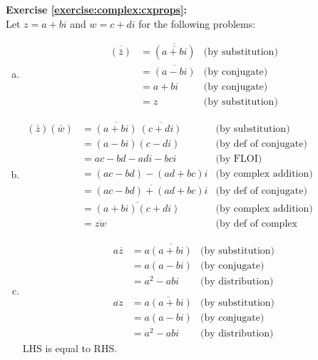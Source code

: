 \noindent\textbf{Exercise \ref{exercise:complex:cxprops}:}\\ %
Let $z=a+bi$ and $w=c+di$ for the following problems:
\begin{enumerate}[(a)]
\item
\begin{align*}
\overline{(\bar{z})} &= \overline{(\overline{a + bi})} &\text{(by substitution)}\\
&= \overline{(a - bi)} &\text{(by conjugate)}\\
&= a + bi &\text{(by conjugate)}\\
&= z &\text{(by substitution)}
\end{align*}

\item
\begin{align*}
(\bar{z})(\bar{w}) &= \overline{(a + bi)} \ \overline{(c + di)} &\text{(by substitution)}\\
&= (a - bi)(c - di) &\text{(by def of conjugate)}\\
&= ac - bd - adi - bci &\text{(by FLOI)}\\
&= (ac - bd) - (ad + bc)i &\text{(by complex addition)}\\
&= \overline{(ac - bd) + (ad + bc)i} &\text{(by def of conjugate)}\\
&= \overline{(a + bi)(c + di)} &\text{(by complex addition)}\\
&= \overline{zw} &\text{(by def of complex multiplication)}
\end{align*}

\item
\begin{align*}
a \overline{z} &= a\overline{(a + bi)} &\text{(by substitution)}\\
&= a(a - bi) &\text{(by conjugate)}\\
&= a^{2} - abi &\text{(by distribution)}\\
\\
\overline{az} &= \overline{a(a + bi)} &\text{(by substitution)}\\
&= a(a - bi) &\text{(by conjugate)}\\
&= a^{2} - abi &\text{(by distribution)}
\end{align*}
LHS is equal to RHS.


\end{enumerate}
